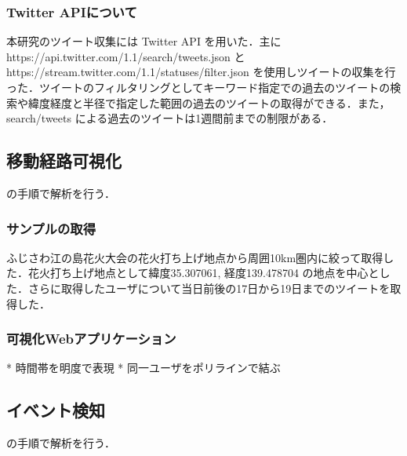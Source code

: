 \subsubsection{Twitter APIについて}
本研究のツイート収集には Twitter API を用いた．主に https://api.twitter.com/1.1/search/tweets.json と https://stream.twitter.com/1.1/statuses/filter.json を使用しツイートの収集を行った．ツイートのフィルタリングとしてキーワード指定での過去のツイートの検索や緯度経度と半径で指定した範囲の過去のツイートの取得ができる．また，search/tweets による過去のツイートは1週間前までの制限がある．

\subsection{移動経路可視化}
の手順で解析を行う．

\subsubsection{サンプルの取得}
ふじさわ江の島花火大会の花火打ち上げ地点から周囲10km圏内に絞って取得した．花火打ち上げ地点として緯度35.307061, 経度139.478704 の地点を中心とした．さらに取得したユーザについて当日前後の17日から19日までのツイートを取得した．


\subsubsection{可視化Webアプリケーション}
* 時間帯を明度で表現
* 同一ユーザをポリラインで結ぶ

\subsection{イベント検知}
の手順で解析を行う．


